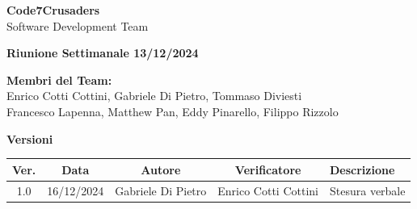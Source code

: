 \documentclass{article}
\begin{document}
\begin{titlepage}
    {\Huge \textbf{Code7Crusaders}}\\
    \vspace{0.5cm}
    {\Large Software Development Team}\\
    \vspace{2cm}
    
    {\large \textbf{Riunione Settimanale 13/12/2024}}\\ 
    \vspace{5cm}                           
    
    
    \textbf{Membri del Team:}\\
    Enrico Cotti Cottini, Gabriele Di Pietro, Tommaso Diviesti \\
    Francesco Lapenna, Matthew Pan, Eddy Pinarello, Filippo Rizzolo \\
    \vspace{0.5cm}
    
    \vspace{1cm}
\end{titlepage}



\newpage
\begin{table}[h!]
\centering
\textbf{Versioni} \\ %
\vspace{2mm} %
\begin{tabular}{|c|c|c|c|>{\raggedright\arraybackslash}p{}|}
    \hline
    \textbf{Ver.} & \textbf{Data} & \textbf{Autore} & \textbf{Verificatore} & \textbf{Descrizione} \\
    \hline
    1.0 & 16/12/2024 & Gabriele Di Pietro & Enrico Cotti Cottini & Stesura verbale \\ 
    \hline                                  
\end{tabular}
\end{table}



\newpage
\tableofcontents



\newpage
\end{document}
